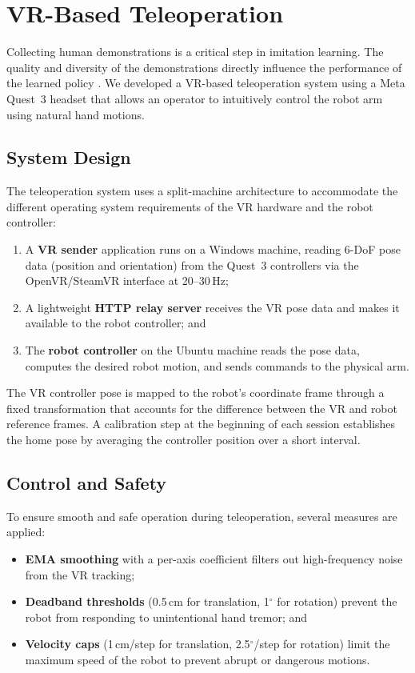\documentclass[conference]{IEEEtran}
\begin{document}
\section{VR-Based Teleoperation}

Collecting human demonstrations is a critical step in imitation learning. The quality and diversity of the demonstrations directly influence the performance of the learned policy \cite{mandlekar2021matters}. We developed a VR-based teleoperation system using a Meta Quest~3 headset that allows an operator to intuitively control the robot arm using natural hand motions.

\subsection{System Design}

The teleoperation system uses a split-machine architecture to accommodate the different operating system requirements of the VR hardware and the robot controller:

\begin{enumerate}
    \item A \textbf{VR sender} application runs on a Windows machine, reading 6-DoF pose data (position and orientation) from the Quest~3 controllers via the OpenVR/SteamVR interface at 20--30\,Hz;
    \item A lightweight \textbf{HTTP relay server} receives the VR pose data and makes it available to the robot controller; and
    \item The \textbf{robot controller} on the Ubuntu machine reads the pose data, computes the desired robot motion, and sends commands to the physical arm.
\end{enumerate}

The VR controller pose is mapped to the robot's coordinate frame through a fixed transformation that accounts for the difference between the VR and robot reference frames. A calibration step at the beginning of each session establishes the home pose by averaging the controller position over a short interval.

\subsection{Control and Safety}

To ensure smooth and safe operation during teleoperation, several measures are applied:
\begin{itemize}
    \item \textbf{EMA smoothing} with a per-axis coefficient filters out high-frequency noise from the VR tracking;
    \item \textbf{Deadband thresholds} (0.5\,cm for translation, 1$^\circ$ for rotation) prevent the robot from responding to unintentional hand tremor; and
    \item \textbf{Velocity caps} (1\,cm/step for translation, 2.5$^\circ$/step for rotation) limit the maximum speed of the robot to prevent abrupt or dangerous motions.
\end{itemize}
\end{document}
